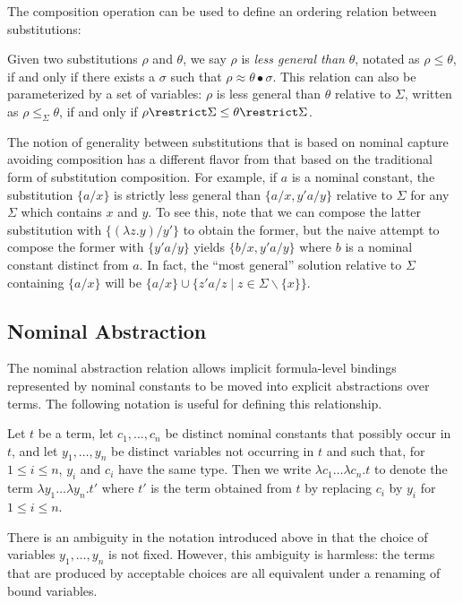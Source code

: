 The composition operation can be used to define an ordering
relation between substitutions:
\begin{definition}\label{nasordering}
Given two substitutions $\rho$ and $\theta$, we say $\rho$ is {\em
  less general than} $\theta$, notated as $\rho \leq \theta$, if and
only if there exists a $\sigma$ such that $\rho \approx
\theta\bullet\sigma$. This relation can also be parameterized by a
set of variables: $\rho$ is less general than $\theta$
relative to $\Sigma$, written as $\rho \leq_\Sigma \theta$, if and
only if $\rho
\restrict \Sigma \leq \theta \restrict \Sigma$.
\end{definition}
The notion of generality between substitutions that is based on
nominal capture avoiding composition has a different flavor from that
based on the traditional form of substitution composition. For
example, if $a$ is a nominal constant, the substitution $\{a/x\}$ is
strictly less general than $\{a/x, y' a/y\}$ relative to $\Sigma$ for
any $\Sigma$ which contains $x$ and $y$. To see this, note that we can
compose the latter substitution with $\{(\lambda z.y)/y'\}$ to obtain
the former, but the naive attempt to compose the former with
$\{y'a/y\}$ yields $\{b/x, y'a/y\}$ where $b$ is a nominal constant
distinct from $a$. In fact, the ``most general'' solution relative to
$\Sigma$ containing $\{a/x\}$ will be $\{a/x\}\cup \{z'a/z \mid
z\in\Sigma\backslash\{x\}\}$.

\subsection{Nominal Abstraction}

The nominal abstraction relation allows implicit formula-level
bindings represented by nominal constants to be moved into explicit
abstractions over terms. The following notation is useful for
defining this relationship.

\begin{notation}
Let $t$ be a term, let $c_1,\ldots,c_n$ be distinct nominal constants that
possibly occur in $t$, and let $y_1,\ldots,y_n$ be distinct variables
not occurring in $t$ and such that, for $1 \leq i \leq n$, $y_i$ and
$c_i$ have the same type. Then we write $\lambda c_1
\ldots\lambda c_n. t$ to denote the term $\lambda y_1 \ldots \lambda
y_n . t'$ where $t'$ is the term obtained from $t$ by replacing
$c_i$ by $y_i$ for $1\leq i\leq n$.
\end{notation}

There is an ambiguity in the notation introduced above in that
the choice of variables $y_1,\ldots,y_n$ is not fixed. However, this
ambiguity is harmless: the terms that are produced by acceptable
choices are all equivalent under a renaming of bound variables.

